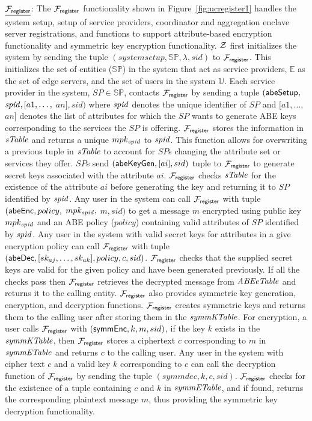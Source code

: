 $\underline{\mathcal{F}_{\mathsf{register}}}$: The $\mathcal{F}_{\mathsf{register}}$ functionality shown in Figure~\ref{fig:ucregister1} handles the system setup, setup of service providers, coordinator and aggregation enclave server registrations, and functions to support attribute-based encryption functionality and symmetric key encryption functionality. %
$\mathcal{Z}$ first initializes the system by sending the tuple $(systemsetup,\mathbb{SP},\lambda,sid)$ to $\mathcal{F}_{\mathsf{register}}$. This initializes the set of entities ($\mathbb{SP}$) in the system that act as service providers, $\mathbb{E}$ as the set of edge servers, and the set of users in the system $\mathbb{U}$. 
Each service provider in the system, $SP \in \mathbb{SP}$,  contacts $\mathcal{F}_{\mathsf{register}}$ by sending a tuple  $(\mathsf{abeSetup},$ $\mathit{spid}, [a1,\dots,$ $an],$$sid)$  where $\mathit{spid}$ denotes the unique identifier of $SP$ and $[a1,\dots,$ $an]$ denotes the list of attributes for which the $SP$ wants to generate ABE keys corresponding to the services the $SP$ is offering. %
$\mathcal{F}_{\mathsf{register}}$ stores the information in $\mathit{sTable}$ and returns a unique $mpk_{\mathit{spid}}$ to $\mathit{spid}$. This function allows for overwriting a previous tuple in $\mathit{sTable}$ to account for $SP$s changing the attribute set or services they offer. %
$SP$s send $(\mathsf{abeKeyGen},[ai],sid)$ tuple to $\mathcal{F}_{\mathsf{register}}$ to generate secret keys associated with the attribute $ai$. $\mathcal{F}_{\mathsf{register}}$ checks $\mathit{sTable}$ for the existence of the attribute $ai$ before generating the key and returning it to $SP$ identified by $\mathit{spid}$. Any user in the system can call $\mathcal{F}_{\mathsf{register}}$ with tuple $(\mathsf{abeEnc},policy,$ $mpk_{\mathit{spid}},$ $m,sid)$ to get a message $m$ encrypted using public key $mpk_{\mathit{spid}}$ and an ABE policy ($policy$) containing valid attributes of $SP$ identified by $\mathit{spid}$. Any user in the system with valid secret keys for attributes in a give encryption policy can call $\mathcal{F}_{\mathsf{register}}$ with tuple $(\mathsf{abeDec},[sk_{aj},\dots,sk_{ak}],policy,c,sid)$. $\mathcal{F}_{\mathsf{register}}$ checks that the supplied secret keys are valid for the given policy and have been generated previously. If all the checks pass then $\mathcal{F}_{\mathsf{register}}$ retrieves the decrypted message from $\mathit{ABEeTable}$ and returns it to the calling entity. $\mathcal{F}_{\mathsf{register}}$ also provides symmetric key generation, encryption, and decryption functions. $\mathcal{F}_{\mathsf{register}}$ creates symmetric keys and returns them to the calling user after storing them in the $\mathit{symmKTable}$. For encryption, a user calls $\mathcal{F}_{\mathsf{register}}$ with $(\mathsf{symmEnc},k,m,sid)$, if the key $k$ exists in the $\mathit{symmKTable}$, then $\mathcal{F}_{\mathsf{register}}$ stores a ciphertext $c$ corresponding to $m$ in $\mathit{symmETable}$ and returns $c$ to the calling user. Any user in the system with cipher text $c$ and a valid key $k$ corresponding to $c$ can call the decryption function of $\mathcal{F}_{\mathsf{register}}$ by sending the tuple $(symmdec,k,c,sid)$. $\mathcal{F}_{\mathsf{register}}$ checks for the existence of a tuple containing $c$ and $k$ in $\mathit{symmETable}$, and if found, returns the corresponding plaintext message $m$, thus providing the symmetric key decryption functionality.
\par 


